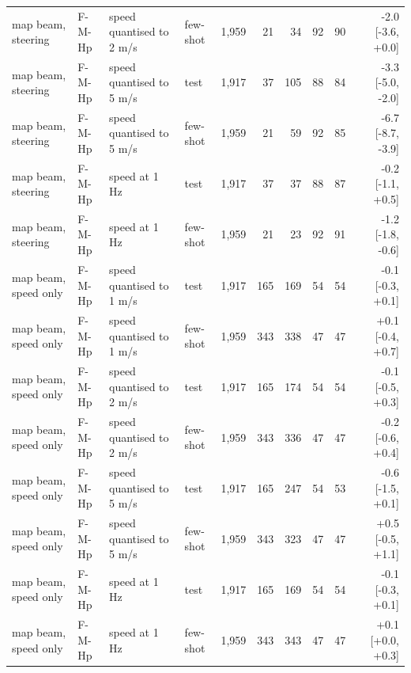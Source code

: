 \begin{table}[t]
\begin{tabular}{llllrrrrrr}
map beam, steering & F-M-Hp & speed quantised to 2 m/s & few-shot & 1{,}959 & 21 & 34 & 92 & 90 & -2.0 [-3.6, +0.0] \\
map beam, steering & F-M-Hp & speed quantised to 5 m/s & test & 1{,}917 & 37 & 105 & 88 & 84 & -3.3 [-5.0, -2.0] \\
map beam, steering & F-M-Hp & speed quantised to 5 m/s & few-shot & 1{,}959 & 21 & 59 & 92 & 85 & -6.7 [-8.7, -3.9] \\
map beam, steering & F-M-Hp & speed at 1 Hz & test & 1{,}917 & 37 & 37 & 88 & 87 & -0.2 [-1.1, +0.5] \\
map beam, steering & F-M-Hp & speed at 1 Hz & few-shot & 1{,}959 & 21 & 23 & 92 & 91 & -1.2 [-1.8, -0.6] \\
map beam, speed only & F-M-Hp & speed quantised to 1 m/s & test & 1{,}917 & 165 & 169 & 54 & 54 & -0.1 [-0.3, +0.1] \\
map beam, speed only & F-M-Hp & speed quantised to 1 m/s & few-shot & 1{,}959 & 343 & 338 & 47 & 47 & +0.1 [-0.4, +0.7] \\
map beam, speed only & F-M-Hp & speed quantised to 2 m/s & test & 1{,}917 & 165 & 174 & 54 & 54 & -0.1 [-0.5, +0.3] \\
map beam, speed only & F-M-Hp & speed quantised to 2 m/s & few-shot & 1{,}959 & 343 & 336 & 47 & 47 & -0.2 [-0.6, +0.4] \\
map beam, speed only & F-M-Hp & speed quantised to 5 m/s & test & 1{,}917 & 165 & 247 & 54 & 53 & -0.6 [-1.5, +0.1] \\
map beam, speed only & F-M-Hp & speed quantised to 5 m/s & few-shot & 1{,}959 & 343 & 323 & 47 & 47 & +0.5 [-0.5, +1.1] \\
map beam, speed only & F-M-Hp & speed at 1 Hz & test & 1{,}917 & 165 & 169 & 54 & 54 & -0.1 [-0.3, +0.1] \\
map beam, speed only & F-M-Hp & speed at 1 Hz & few-shot & 1{,}959 & 343 & 343 & 47 & 47 & +0.1 [+0.0, +0.3] \\
\bottomrule\end{tabular}
\end{table}
